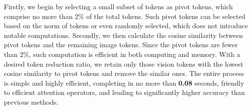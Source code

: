 Firstly, we begin by selecting a small subset of tokens as pivot tokens, which comprise no more than $2\%$ of the total tokens. Such pivot tokens can be selected based on the norm of tokens or even randomly selected, which does not introduce notable computations.
Secondly, we then calculate the cosine similarity between pivot tokens and the remaining image tokens. Since the pivot tokens are fewer than $2\%$, such computation is efficient in both computing and memory.
With a desired token reduction ratio, we retain only those vision tokens with the lowest cosine similarity to pivot tokens and remove the similar ones.
The entire process is simple and highly efficient, completing in no more than \textbf{0.08} seconds, friendly to efficient attention operators, and leading to significantly higher accuracy than previous methods.

